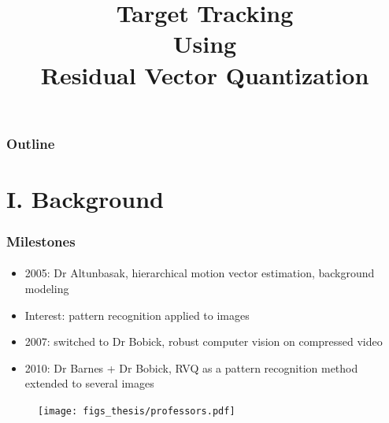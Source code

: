 
\title{Target Tracking \\ Using \\Residual Vector Quantization}
\begin{frame}[plain]\logoCSIPCPL\logoTechTower
	\titlepage
\end{frame}

\begin{frame}
\frametitle{Outline}
\logoCSIPCPL\logoTechTower
	\setcounter{tocdepth}{2}	
	\tableofcontents
\end{frame}

\section{I. Background}
\begin{frame}
\frametitle{Milestones}
\framesubtitle{}
\logoCSIPCPL\mypagenum
\vspace{0.2in}
\begin{itemize}
\item 2005: Dr Altunbasak, hierarchical motion vector estimation, background modeling
\item {\color{blue}Interest}: pattern recognition applied to images
\item 2007: switched to Dr Bobick, robust computer vision on compressed video
\item 2010: Dr Barnes + Dr Bobick, RVQ as a pattern recognition method extended to several images
\end{itemize}
\begin{figure}
\texttt{[image: figs\_thesis/professors.pdf]}
\end{figure}
\end{frame}

